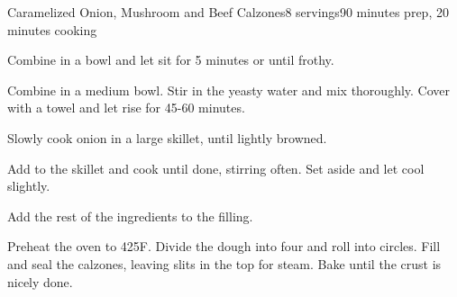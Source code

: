 \documentclass[../Cookbook.tex]{subfiles}
\begin{document}
\begin{recipe}{Caramelized Onion, Mushroom and Beef Calzones}{8 servings}{90 minutes prep, 20 minutes cooking}

Combine in a bowl and let sit for 5 minutes or until frothy.

Combine in a medium bowl. Stir in the yeasty water and mix thoroughly. Cover with a towel and let rise for 45-60 minutes.

Slowly cook onion in a large skillet, until lightly browned.

Add to the skillet and cook until done, stirring often. Set aside and let cool slightly.

Add the rest of the ingredients to the filling.

\newstep
Preheat the oven to 425\0F.
Divide the dough into four and roll into circles. Fill and seal the calzones, leaving slits in the top for steam. Bake until the crust is nicely done.

\end{recipe}
\end{document}
